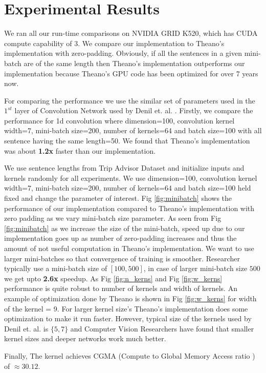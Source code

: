 \documentclass{article}
\begin{document}
\section*{Experimental Results}
We ran all our run-time comparisons on NVIDIA GRID K520, which has CUDA compute capability of 3. We compare our implementation to Theano's implementation with zero-padding. Obviously, if all the sentences in a given mini-batch are of the same length then Theano's implementation outperforms our implementation because Theano's GPU code has been optimized for over 7 years now. 

For comparing the performance we use the similar set of parameters used in the $1^{st}$ layer of Convolution Network used by Denil et. al. \cite{Denil2014c}. Firstly, we compare the performance for 1d convolution where dimension=100, convolution kernel width=7, mini-batch size=200, number of kernels=64 and batch size=100 with all sentence having the same length=50. We found that Theano's implementation was about \textbf{1.2x} faster than our implementation. 

We use sentence lengths from Trip Advisor Dataset and initialize inputs and kernels randomly for all experiments. We use dimension=100, convolution kernel width=7, mini-batch size=200, number of kernels=64 and batch size=100 held fixed and change the parameter of interest. 
Fig \ref{fig:minibatch} shows the performance of our implementation compared to Theano's implementation with zero padding as we vary mini-batch size parameter. As seen from Fig \ref{fig:minibatch} as we increase the size of the mini-batch, speed up due to our implementation goes up as number of zero-padding increases and thus the amount of not useful computation in Theano's implementation. We want to use larger mini-batches so that convergence of training is smoother. Researcher typically use a mini-batch size of $[100, 500]$, in case of larger mini-batch size $500$ we get upto \textbf{2.6x} speedup. As Fig \ref{fig:n_kerns} and Fig \ref{fig:w_kerns} performance is quite robust to number of kernels and width of kernels. An example of optimization done by Theano is shown in Fig \ref{fig:w_kerns} for width of the kernel = 9. For larger kernel size's Theano's implementation does some optimization to make it run faster. However, typical size of the kernels used by Denil et. al. \cite{Denil2014c} is $\{5, 7\}$ and Computer Vision Researchers have found that smaller kernel sizes and deeper networks work much better. 

Finally, The kernel achieves CGMA (Compute to Global Memory Access ratio ) of $\approx 30.12$.  
\end{document}
